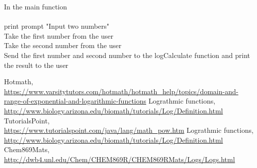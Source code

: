 \documentclass[a4paper, 11pt]{article}
\begin{document}
In the main function \\
{   \\
   print prompt "Input two numbers" \\
         
   Take the first number from the user \\
   Take the second number from the user\\
  
   Send the first number and second number to the logCalculate function and print the result to the user \\   
} 


\begin{thebibliography}{9}
Hotmath,\\
\url{https://www.varsitytutors.com/hotmath/hotmath_help/topics/domain-and-range-of-exponential-and-logarithmic-functions}
Lograthmic functions,\\
\url{http://www.biology.arizona.edu/biomath/tutorials/Log/Definition.html}
TutorialsPoint,\\
\url{https://www.tutorialspoint.com/java/lang/math_pow.htm}
Lograthmic functions,\\
\url{http://www.biology.arizona.edu/biomath/tutorials/Log/Definition.html}
Chem869Mats,\\
\url{http://dwb4.unl.edu/Chem/CHEM869R/CHEM869RMats/Logs/Logs.html}

\end{thebibliography}
\end{document}
